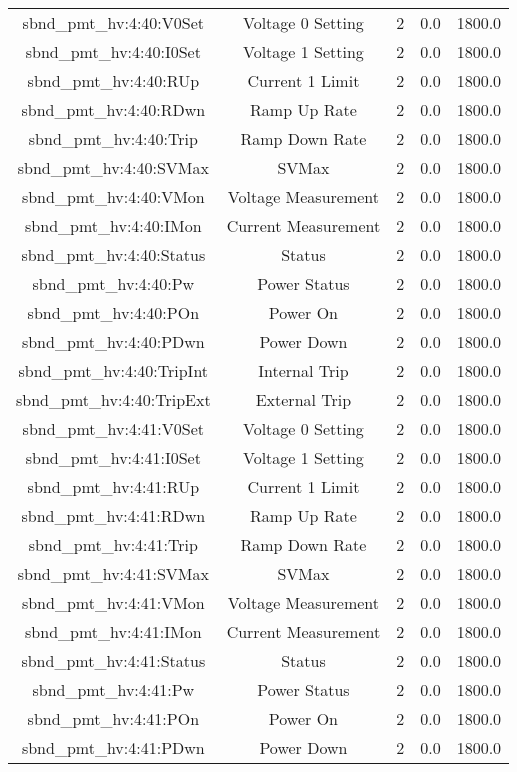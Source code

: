 \begin{center}
\begin{longtable}{c | c c c c }
sbnd\_pmt\_hv:4:40:V0Set & Voltage 0 Setting & 2 & 0.0 & 1800.0\\ 
sbnd\_pmt\_hv:4:40:I0Set & Voltage 1 Setting & 2 & 0.0 & 1800.0\\ 
sbnd\_pmt\_hv:4:40:RUp & Current 1 Limit & 2 & 0.0 & 1800.0\\ 
sbnd\_pmt\_hv:4:40:RDwn & Ramp Up Rate & 2 & 0.0 & 1800.0\\ 
sbnd\_pmt\_hv:4:40:Trip & Ramp Down Rate & 2 & 0.0 & 1800.0\\ 
sbnd\_pmt\_hv:4:40:SVMax & SVMax & 2 & 0.0 & 1800.0\\ 
sbnd\_pmt\_hv:4:40:VMon & Voltage Measurement & 2 & 0.0 & 1800.0\\ 
sbnd\_pmt\_hv:4:40:IMon & Current Measurement & 2 & 0.0 & 1800.0\\ 
sbnd\_pmt\_hv:4:40:Status & Status & 2 & 0.0 & 1800.0\\ 
sbnd\_pmt\_hv:4:40:Pw & Power Status & 2 & 0.0 & 1800.0\\ 
sbnd\_pmt\_hv:4:40:POn & Power On & 2 & 0.0 & 1800.0\\ 
sbnd\_pmt\_hv:4:40:PDwn & Power Down & 2 & 0.0 & 1800.0\\ 
sbnd\_pmt\_hv:4:40:TripInt & Internal Trip & 2 & 0.0 & 1800.0\\ 
sbnd\_pmt\_hv:4:40:TripExt & External Trip & 2 & 0.0 & 1800.0\\ 
sbnd\_pmt\_hv:4:41:V0Set & Voltage 0 Setting & 2 & 0.0 & 1800.0\\ 
sbnd\_pmt\_hv:4:41:I0Set & Voltage 1 Setting & 2 & 0.0 & 1800.0\\ 
sbnd\_pmt\_hv:4:41:RUp & Current 1 Limit & 2 & 0.0 & 1800.0\\ 
sbnd\_pmt\_hv:4:41:RDwn & Ramp Up Rate & 2 & 0.0 & 1800.0\\ 
sbnd\_pmt\_hv:4:41:Trip & Ramp Down Rate & 2 & 0.0 & 1800.0\\ 
sbnd\_pmt\_hv:4:41:SVMax & SVMax & 2 & 0.0 & 1800.0\\ 
sbnd\_pmt\_hv:4:41:VMon & Voltage Measurement & 2 & 0.0 & 1800.0\\ 
sbnd\_pmt\_hv:4:41:IMon & Current Measurement & 2 & 0.0 & 1800.0\\ 
sbnd\_pmt\_hv:4:41:Status & Status & 2 & 0.0 & 1800.0\\ 
sbnd\_pmt\_hv:4:41:Pw & Power Status & 2 & 0.0 & 1800.0\\ 
sbnd\_pmt\_hv:4:41:POn & Power On & 2 & 0.0 & 1800.0\\ 
sbnd\_pmt\_hv:4:41:PDwn & Power Down & 2 & 0.0 & 1800.0\\ 

\end{longtable}
\end{center}
